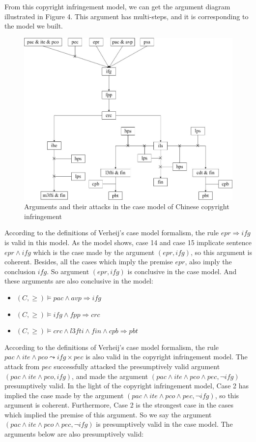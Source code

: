 \documentclass{IOS-Book-Article}
\begin{document}
\normalsize
From this copyright infringement model, we can get the argument diagram illustrated in Figure 4. This argument has multi-steps, and it is corresponding to the model we built.

\begin{figure} [htbp]
\centering
\includegraphics [scale=0.32] {argument_diagram1.jpg}
\caption{Arguments and their attacks in the case model of Chinese copyright infringement}
\end{figure}

According to the definitions of Verheij's case model formalism, the rule $epr \Rightarrow ifg$ is valid in this model. As the model shows, case 14 and case 15 implicate sentence $epr \wedge ifg$ which is the case made by the argument $(epr, ifg)$, so this argument is coherent. Besides, all the cases which imply the premise $epr$, also imply the conclusion $ifg$. So argument $(epr, ifg)$ is conclusive in the case model. And these arguments are also conclusive in the model:

\begin{itemize}
\item $(C,  \geq) \models pac \wedge avp \Rightarrow ifg$
\item $(C,  \geq) \models ifg \wedge fpp \Rightarrow crc$
\item $(C,  \geq) \models crc \wedge l3fti \wedge fin \wedge cpb \Rightarrow pbt$
\end{itemize}

According to the definitions of Verheij's case model formalism, the rule $pac \wedge ite \wedge pco \leadsto ifg \times pec$ is also valid in the copyright infringement model. The attack from $pec$ successfully attacked the presumptively valid argument $(pac \wedge ite \wedge pco, ifg)$, and made the argument $(pac \wedge ite \wedge pco \wedge pec, \neg ifg)$ presumptively valid. In the light of the copyright infringement model, Case 2 has implied the case made by the argument $(pac \wedge ite \wedge pco \wedge pec, \neg ifg)$, so this argument is coherent. Furthermore, Case 2 is the strongest case in the cases which implied the premise of this argument. So we say the argument $(pac \wedge ite \wedge pco \wedge pec, \neg ifg)$ is presumptively valid in the case model. The arguments below are also presumptively valid:
\end{document}
